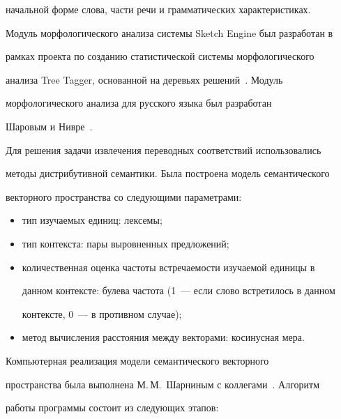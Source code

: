 начальной форме слова, части речи и грамматических характеристиках.


Модуль морфологического анализа системы Sketch Engine был разработан в


рамках проекта по созданию статистической системы морфологического


анализа Tree Tagger, основанной на деревьях решений~\cite{14-m}. Модуль


морфологического анализа для русского языка был разработан


Шаровым и Нивре~\cite{15-m}.





  Для решения задачи извлечения переводных соответствий использовались


методы дистрибутивной семантики. Была построена модель семантического


векторного пространства со следующими параметрами:


  \begin{itemize}


\item тип изучаемых единиц: лексемы;


\item тип контекста: пары выровненных предложений;


\item количественная оценка частоты встречаемости изучаемой единицы в


данном контексте: булева частота (1~--- если слово встретилось в данном


контексте, 0~--- в противном случае);


\item метод вычисления расстояния между векторами: косинусная мера.


\end{itemize}





  Компьютерная реализация модели семантического векторного


пространства была выполнена М.\,М.~Шарниным с коллегами~\cite{16-m}. Алгоритм


работы программы состоит из следующих этапов:


